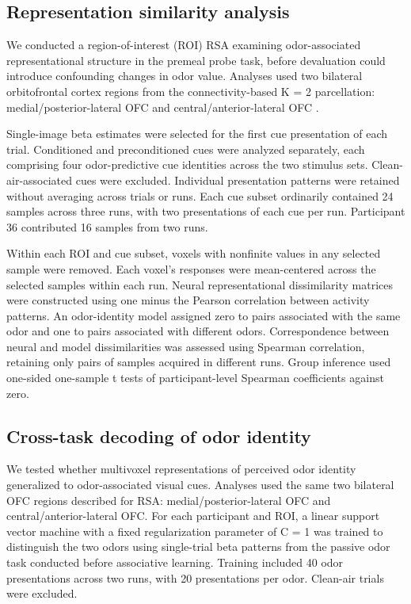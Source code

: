 \documentclass[12pt,letterpaper]{article}
\begin{document}
\subsection*{Representation similarity analysis}
\label{rsa-probe}

We conducted a region-of-interest (ROI) RSA examining odor-associated representational structure in the premeal probe task, before devaluation could introduce confounding changes in odor value. Analyses used two bilateral orbitofrontal cortex regions from the connectivity-based K = 2 parcellation: medial/posterior-lateral OFC and central/anterior-lateral OFC \cite{kahnt2012connectivity}.

Single-image beta estimates were selected for the first cue presentation of each trial. Conditioned and preconditioned cues were analyzed separately, each comprising four odor-predictive cue identities across the two stimulus sets. Clean-air-associated cues were excluded. Individual presentation patterns were retained without averaging across trials or runs. Each cue subset ordinarily contained 24 samples across three runs, with two presentations of each cue per run. Participant 36 contributed 16 samples from two runs.

Within each ROI and cue subset, voxels with nonfinite values in any selected sample were removed. Each voxel’s responses were mean-centered across the selected samples within each run. Neural representational dissimilarity matrices were constructed using one minus the Pearson correlation between activity patterns. An odor-identity model assigned zero to pairs associated with the same odor and one to pairs associated with different odors. Correspondence between neural and model dissimilarities was assessed using Spearman correlation, retaining only pairs of samples acquired in different runs. Group inference used one-sided one-sample t tests of participant-level Spearman coefficients against zero. 


\subsection*{Cross-task decoding of odor identity}

We tested whether multivoxel representations of perceived odor identity generalized to odor-associated visual cues. Analyses used the same two bilateral OFC regions described for RSA: medial/posterior-lateral OFC and central/anterior-lateral OFC. For each participant and ROI, a linear support vector machine with a fixed regularization parameter of C = 1 was trained to distinguish the two odors using single-trial beta patterns from the passive odor task conducted before associative learning. Training included 40 odor presentations across two runs, with 20 presentations per odor. Clean-air trials were excluded.
\end{document}
